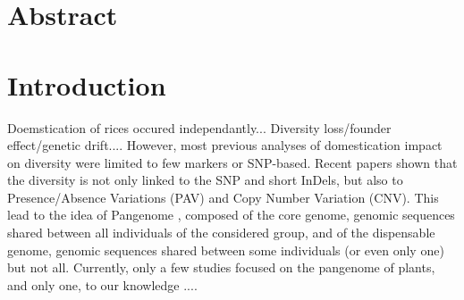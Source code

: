 \documentclass[10pt,letterpaper]{article}
\begin{document}
\section*{Abstract}
\linenumbers

\section*{Introduction}
Doemstication of rices occured independantly...
Diversity loss/founder effect/genetic drift....
However, most previous analyses of domestication impact on diversity were limited to few markers or SNP-based. Recent papers \cite{REFpangenome} shown that the diversity is not only linked to the SNP and short InDels, but also to Presence/Absence Variations (PAV) and Copy Number Variation (CNV). This lead to the idea of Pangenome \cite{Tettelin2005, Tranchant2018}, composed of the core genome, genomic sequences shared between all individuals of the considered group, and of the dispensable genome, genomic sequences shared between some individuals (or even only one) but not all. Currently, only a few studies focused on the pangenome of plants, and only one, to our knowledge \cite{Han2018}....
\end{document}
